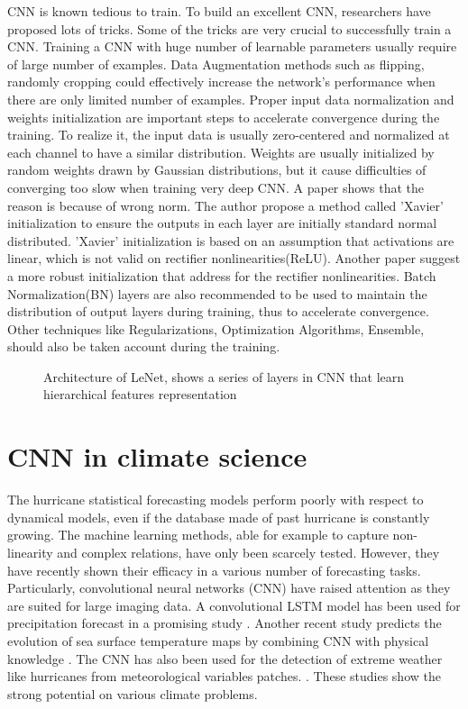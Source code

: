 CNN is known tedious to train. To build an excellent CNN, researchers have proposed lots of tricks. Some of the tricks are very crucial to successfully train a CNN. Training a CNN with huge number of learnable parameters usually require of large number of examples. Data Augmentation methods such as flipping, randomly cropping could effectively increase the network's performance when there are only limited number of examples. Proper input data normalization and weights initialization are important steps to accelerate convergence during the training. To realize it, the input data is usually zero-centered and normalized at each channel to have a similar distribution. Weights are usually initialized by random weights drawn by Gaussian distributions\cite{krizhevsky2012imagenet}, but it cause difficulties of converging too slow when training very deep CNN. A paper shows that the reason is because of wrong norm. The author propose a method called 'Xavier' initialization\cite{glorot2010understanding} to ensure the outputs in each layer are initially standard normal distributed. 'Xavier' initialization is based on an assumption that activations are linear, which is not valid on rectifier nonlinearities(ReLU). Another paper suggest a more robust initialization that address for the rectifier nonlinearities\cite{he2015delving}. Batch Normalization(BN) layers are also recommended to be used to maintain the distribution of output layers during training, thus to accelerate convergence\cite{krizhevsky2012imagenet}. Other techniques like Regularizations, Optimization Algorithms, Ensemble, should also be taken account during the training.

\begin{figure}
	\begin{center}
		\hsize {}
	\end{center}
	\caption{Architecture of LeNet, shows a series of layers in CNN that learn hierarchical features representation \cite{lecun1998gradient} }
	\label{fig:LeNet}
\end{figure}


\section{CNN in climate science}
The hurricane statistical forecasting models perform poorly with respect to dynamical models, even if the database made of past hurricane is constantly growing. The machine learning methods, able for example to capture non-linearity and complex relations, have only been scarcely tested. However, they have recently shown their efficacy in a various number of forecasting tasks. Particularly, convolutional neural networks (CNN) have raised attention as they are suited for large imaging data. A convolutional LSTM model has been used for precipitation forecast in a promising study \cite{xingjian2015convolutional}. Another recent study predicts the evolution of sea surface temperature maps by combining CNN with physical knowledge \cite{de2017deep}. The CNN has also been used for the detection of extreme weather like hurricanes from meteorological variables patches. \cite{racah2017extremeweather}. These studies show the strong potential on various climate problems. 

